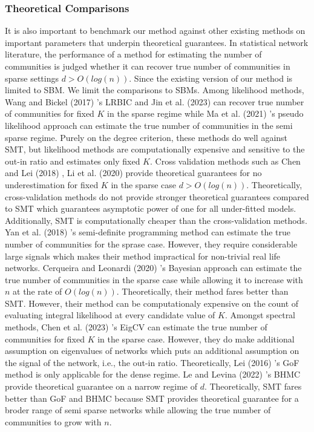 \documentclass[11pt]{article}
\begin{document}
\subsubsection{Theoretical Comparisons}
It is also important to benchmark our method against other existing methods on important parameters that underpin theoretical guarantees. In statistical network literature, the performance of a method for estimating the number of communities is judged whether it can recover true number of communities in sparse settings $d > O(log(n))$. Since the existing version of our method is limited to SBM. We limit the comparisons to SBMs. Among likelihood methods, Wang and Bickel (2017) \cite{wang17}'s LRBIC and Jin et al. (2023) \cite{jin2023} can recover true number of communities for fixed $K$ in the sparse regime while Ma et al. (2021) \cite{ma2019}'s pseudo likelihood approach can estimate the true number of communities in the semi sparse regime. Purely on the degree criterion, these methods do well against SMT, but likelihood methods are computationally expensive and sensitive to the out-in ratio and estimates only fixed $K$. Cross validation methods such as Chen and Lei (2018) \cite{chen2018}, Li et al. (2020) \cite{li2020} provide theoretical guarantees for no underestimation for fixed $K$ in the sparse case $d > O(log(n))$. Theoretically, cross-validation methods do not provide stronger theoretical guarantees compared to SMT which guarantees asymptotic power of one for all under-fitted models. Additionally, SMT is computationally cheaper than the cross-validation methods. Yan et al. (2018) \cite{yan2018}'s semi-definite programming method can estimate the true number of communities for the sprase case. However, they require considerable large signals which makes their method impractical for non-trivial real life networks. Cerqueira and Leonardi (2020) \cite{cerqueira2020}'s Bayesian approach can estimate the true number of communities in the sparse case while allowing it to increase with $n$ at the rate of $O(log(n))$. Theoretically, their method fares better than SMT. However, their method can be computationaly expensive on the count of evaluating integral likelihood at every candidate value of $K$. Amongst spectral methods, Chen et al. (2023) \cite{chen2021}'s EigCV can estimate the true number of communities for fixed $K$ in the sparse case. However, they do make additional assumption on eigenvalues of networks which puts an additional assumption on the signal of the network, i.e., the out-in ratio. Theoretically, Lei (2016) \cite{lei16}'s GoF method is only applicable for the dense regime. Le and Levina (2022) \cite{le2022}'s BHMC provide theoretical guarantee on a narrow regime of $d$. Theoretically, SMT fares better than GoF and BHMC because SMT provides theoretical guarantee for a broder range of semi sparse networks while allowing the true number of communities to grow with $n$.
\end{document}

